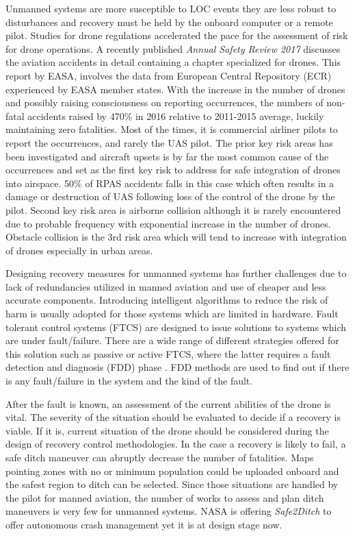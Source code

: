 Unmanned systems are more susceptible to LOC events they are less robust to disturbances and recovery must be held by the onboard computer or a remote pilot\cite{richards2016vehicle}.
Studies for drone regulations accelerated the pace for the assessment of risk for drone operations. A recently published \emph{Annual Safety Review 2017} \cite{annualSafetyReview} discusses the aviation accidents in detail containing a chapter specialized for drones. 
This report by EASA, involves the data from European Central Repository (ECR) experienced by EASA member states.
With the increase in the number of drones and possibly raising consciousness on reporting occurrences, the numbers of non-fatal accidents raised by 470\% in 2016 relative to 2011-2015 average, luckily maintaining zero fatalities. 
Most of the times, it is commercial airliner pilots to report the occurrences, and rarely the UAS pilot.
The prior key risk areas has been investigated and aircraft upsets is by far the most common cause of the occurrences and set as the first key risk to address for safe integration of drones into airspace. 
50\% of RPAS accidents falls in this case which often results in a damage or destruction of UAS following loss of the control of the drone by the pilot.
Second key risk area is airborne collision although it is rarely encountered due to probable frequency with exponential increase in the number of drones. 
Obstacle collision is the 3rd risk area which will tend to increase with integration of drones especially in urban areas.

Designing recovery measures for unmanned systems has further challenges due to lack of redundancies utilized in manned aviation and use of cheaper and less accurate components.
Introducing intelligent algorithms to reduce the risk of harm is usually adopted for those systems which are limited in hardware. 
Fault tolerant control systems (FTCS) are designed to issue solutions to systems which are under fault/failure. 
There are a wide range of different strategies offered for this solution such as passive or active FTCS, where the latter requires a fault detection and diagnosis (FDD) phase \cite{ducard2009fault}. 
FDD methods are used to find out if there is any fault/failure in the system and the kind of the fault. 

After the fault is known, an assessment of the current abilities of the drone is vital. 
The severity of the situation should be evaluated to decide if a recovery is viable. 
If it is, current situation of the drone should be considered during the design of recovery control methodologies.
In the case a recovery is likely to fail, a safe ditch maneuver can abruptly decrease the number of fatalities. 
Maps pointing zones with no or minimum population could be uploaded onboard and the safest region to ditch can be selected. 
Since those situations are handled by the pilot for manned aviation, the number of works to assess and plan ditch maneuvers is very few for unmanned systems. 
NASA is offering \emph{Safe2Ditch} \cite{nasa:safe2ditch} to offer autonomous crash management yet it is at design stage now. 



